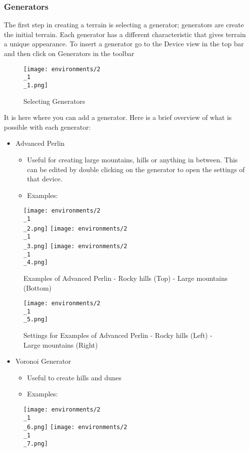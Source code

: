\documentclass[../main.tex]{subfiles}
\begin{document}
\subsubsection{Generators}
The first step in creating a terrain is selecting a generator; generators are create the initial terrain. Each generator has a different characteristic that gives terrain a unique appearance. To insert a generator go to the Device view in the top bar and then click on Generators in the toolbar
\begin{figure}[H]
\texttt{[image: environments/2\\\_1\\\_1.png]}
\caption{Selecting Generators}
\end{figure}
It is here where you can add a generator.
Here is a brief overview of what is possible with each generator:
\begin{itemize}
    \item Advanced Perlin
    \begin{itemize}
        \item Useful for creating large mountains, hills or anything in between. This can be edited by double clicking on the generator to open the settings of that device.
        \item Examples:
    \end{itemize}
\end{itemize}
\begin{figure}[H]
\texttt{[image: environments/2\\\_1\\\_2.png]}
\texttt{[image: environments/2\\\_1\\\_3.png]}
\texttt{[image: environments/2\\\_1\\\_4.png]}
\caption{Examples of Advanced Perlin - Rocky hills (Top) - Large mountains (Bottom)}
\end{figure}
\begin{figure}[H]
\texttt{[image: environments/2\\\_1\\\_5.png]}
\caption{Settings for Examples of Advanced Perlin - Rocky hills (Left) - Large mountains (Right)}
\end{figure}
\begin{itemize}
    \item Voronoi Generator
    \begin{itemize}
        \item Useful to create hills and dunes
        \item Examples:
    \end{itemize}
\end{itemize}
\begin{figure}[H]
\texttt{[image: environments/2\\\_1\\\_6.png]}
\texttt{[image: environments/2\\\_1\\\_7.png]}
\end{figure}
\end{document}
